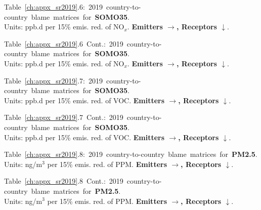 \footnotesize{\mbox{Table \ref{ch:appx_sr2019}.6: 2019 country-to-country blame matrices for \textbf{SOMO35}.}\\ Units: ppb.d per 15\% emis. red. of NO$_x$. \textbf{Emitters $\rightarrow$, Receptors $\downarrow$}. }\\[\baselineskip]\enlargethispage{\myenlarge} \hspace{-0.5cm} 
\centerline{}\clearpage
\footnotesize{\mbox{Table \ref{ch:appx_sr2019}.6 Cont.: 2019 country-to-country blame matrices for \textbf{SOMO35}.}\\ Units: ppb.d per 15\% emis. red. of NO$_x$. \textbf{Emitters $\rightarrow$, Receptors $\downarrow$}. }\\[\baselineskip]\enlargethispage{\myenlarge} \hspace{-0.5cm} 
\centerline{}\clearpage

\footnotesize{\mbox{Table \ref{ch:appx_sr2019}.7: 2019 country-to-country blame matrices for \textbf{SOMO35}.}\\ Units: ppb.d per 15\% emis. red. of VOC. \textbf{Emitters $\rightarrow$, Receptors $\downarrow$}. }\\[\baselineskip]\enlargethispage{\myenlarge} \hspace{-0.5cm} 
\centerline{}\clearpage
\footnotesize{\mbox{Table \ref{ch:appx_sr2019}.7 Cont.: 2019 country-to-country blame matrices for \textbf{SOMO35}.}\\ Units: ppb.d per 15\% emis. red. of VOC. \textbf{Emitters $\rightarrow$, Receptors $\downarrow$}. }\\[\baselineskip]\enlargethispage{\myenlarge} \hspace{-0.5cm} 
\centerline{}\clearpage

\footnotesize{\mbox{Table \ref{ch:appx_sr2019}.8: 2019 country-to-country blame matrices for \textbf{PM2.5}.}\\ Units: ng/m$^3$ per 15\% emis. red. of PPM. \textbf{Emitters $\rightarrow$, Receptors $\downarrow$}. }\\[\baselineskip]\enlargethispage{\myenlarge} \hspace{-0.5cm} 
\centerline{}\clearpage
\footnotesize{\mbox{Table \ref{ch:appx_sr2019}.8 Cont.: 2019 country-to-country blame matrices for \textbf{PM2.5}.}\\ Units: ng/m$^3$ per 15\% emis. red. of PPM. \textbf{Emitters $\rightarrow$, Receptors $\downarrow$}. }\\[\baselineskip]\enlargethispage{\myenlarge} \hspace{-0.5cm} 
\centerline{}\clearpage

